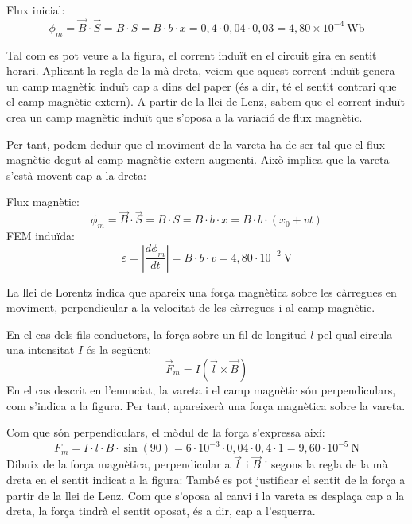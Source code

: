 \begin{solapartat}
 Flux inicial:
\[ \phi_m = \vec{B}\cdot\vec{S} = B\cdot S = B\cdot b\cdot x = 0,4\cdot 0,04\cdot 0,03 = 4,80\times 10^{-4}\ \mathrm{Wb} \]

 Tal com es pot veure a la figura, el corrent induït en el circuit gira en sentit horari. Aplicant la regla de la mà dreta, veiem que aquest corrent induït genera un camp magnètic induït cap a dins del paper (és a dir, té el sentit contrari que el camp magnètic extern).
A partir de la llei de Lenz, sabem que el corrent induït crea un camp magnètic induït que s'oposa a la variació de flux magnètic.

Per tant, podem deduir que el moviment de la vareta ha de ser tal que el flux magnètic degut al camp magnètic extern augmenti. Això implica que la vareta s'està movent cap a la dreta:

 Flux magnètic:
\[ \phi_m = \vec{B}\cdot\vec{S} = B\cdot S = B\cdot b\cdot x = B\cdot b\cdot (x_0 + vt) \]
FEM induïda:
\[ \varepsilon = \left|\frac{d\phi_m}{dt}\right| = B\cdot b\cdot v = 4,80\cdot 10^{-2}\ \mathrm{V} \]
\end{solapartat}

\begin{solapartat}
 La llei de Lorentz indica que apareix una força magnètica sobre les càrregues en moviment, perpendicular a la velocitat de les càrregues i al camp magnètic.

En el cas dels fils conductors, la força sobre un fil de longitud $l$ pel qual circula una intensitat $I$ és la següent:
\[ \vec{F}_m = I(\vec{l}\times\vec{B}) \]
En el cas descrit en l'enunciat, la vareta i el camp magnètic són perpendiculars, com s'indica a la figura. Per tant, apareixerà una força magnètica sobre la vareta.

 Com que són perpendiculars, el mòdul de la força s'expressa així:
\[ F_m = I\cdot l\cdot B\cdot \sin(90) = 6\cdot 10^{-3}\cdot 0,04\cdot 0,4\cdot 1 = 9,60\cdot 10^{-5}\ \mathrm{N} \]
 Dibuix de la força magnètica, perpendicular a $\vec{l}$ i $\vec{B}$ i segons la regla de la mà dreta en el sentit indicat a la figura:
També es pot justificar el sentit de la força a partir de la llei de Lenz. Com que s'oposa al canvi i la vareta es desplaça cap a la dreta, la força tindrà el sentit oposat, és a dir, cap a l'esquerra.
\end{solapartat}
